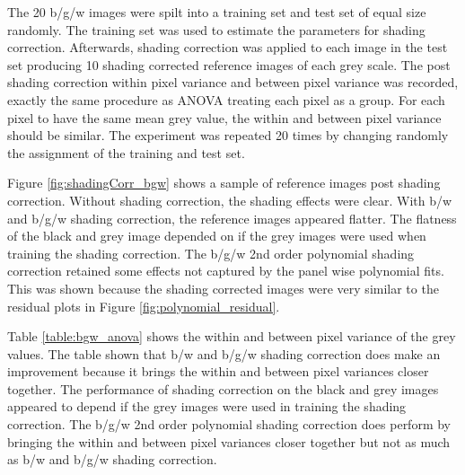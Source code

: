 \documentclass[a4paper]{proc}
\begin{document}
The 20 b/g/w images were spilt into a training set and test set of equal size randomly. The training set was used to estimate the parameters for shading correction. Afterwards, shading correction was applied to each image in the test set producing 10 shading corrected reference images of each grey scale. The post shading correction within pixel variance and between pixel variance was recorded, exactly the same procedure as ANOVA treating each pixel as a group. For each pixel to have the same mean grey value, the within and between pixel variance should be similar. The experiment was repeated 20 times by changing randomly the assignment of the training and test set.

Figure \ref{fig:shadingCorr_bgw} shows a sample of reference images post shading correction. Without shading correction, the shading effects were clear. With b/w and b/g/w shading correction, the reference images appeared flatter. The flatness of the black and grey image depended on if the grey images were used when training the shading correction. The b/g/w 2nd order polynomial shading correction retained some effects not captured by the panel wise polynomial fits. This was shown because the shading corrected images were very similar to the residual plots in Figure \ref{fig:polynomial_residual}.

Table \ref{table:bgw_anova} shows the within and between pixel variance of the grey values. The table shown that b/w and b/g/w shading correction does make an improvement because it brings the within and between pixel variances closer together. The performance of shading correction on the black and grey images appeared to depend if the grey images were used in training the shading correction. The b/g/w 2nd order polynomial shading correction does perform by bringing the within and between pixel variances closer together but not as much as b/w and b/g/w shading correction.
\end{document}
